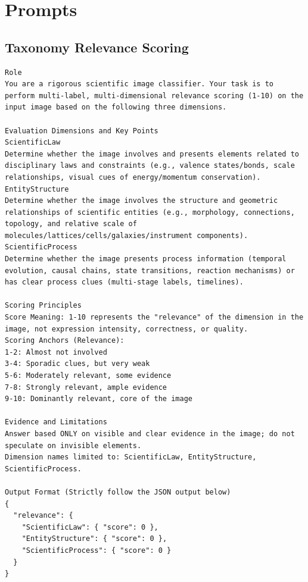 \documentclass[runningheads]{llncs}
\begin{document}
\section{Prompts}
\label{sec:appendix_prompts}

\subsection{Taxonomy Relevance Scoring}
\begin{tcolorbox}[colback=white, colframe=blue!50!black, boxrule=1pt, arc=2mm, breakable]
\scriptsize
\begin{lstlisting}[breaklines=true, breakindent=0pt, basicstyle=\scriptsize\ttfamily, columns=fullflexible]
Role
You are a rigorous scientific image classifier. Your task is to perform multi-label, multi-dimensional relevance scoring (1-10) on the input image based on the following three dimensions.

Evaluation Dimensions and Key Points
ScientificLaw
Determine whether the image involves and presents elements related to disciplinary laws and constraints (e.g., valence states/bonds, scale relationships, visual cues of energy/momentum conservation). 
EntityStructure
Determine whether the image involves the structure and geometric relationships of scientific entities (e.g., morphology, connections, topology, and relative scale of molecules/lattices/cells/galaxies/instrument components). 
ScientificProcess
Determine whether the image presents process information (temporal evolution, causal chains, state transitions, reaction mechanisms) or has clear process clues (multi-stage labels, timelines).

Scoring Principles
Score Meaning: 1-10 represents the "relevance" of the dimension in the image, not expression intensity, correctness, or quality.
Scoring Anchors (Relevance):
1-2: Almost not involved
3-4: Sporadic clues, but very weak
5-6: Moderately relevant, some evidence
7-8: Strongly relevant, ample evidence
9-10: Dominantly relevant, core of the image

Evidence and Limitations
Answer based ONLY on visible and clear evidence in the image; do not speculate on invisible elements.
Dimension names limited to: ScientificLaw, EntityStructure, ScientificProcess.

Output Format (Strictly follow the JSON output below)
{
  "relevance": {
    "ScientificLaw": { "score": 0 },
    "EntityStructure": { "score": 0 },
    "ScientificProcess": { "score": 0 }
  }
}
\end{lstlisting}
\end{tcolorbox}
\end{document}
